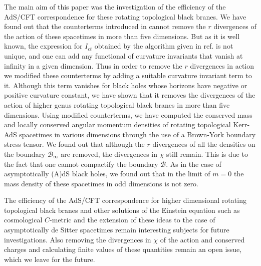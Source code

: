 \documentclass[a4paper,12pt,onecolumn]{revtex4}
\begin{document}
The main aim of this paper was the investigation of the efficiency of the
AdS/CFT correspondence for these rotating topological black branes. We have
found out that the counterterms introduced in \cite{Kls} cannot remove the $%
r $ divergences of the action of these spacetimes in more than
five dimensions. But as it is well known, the expression for
$I_{ct}$ obtained by the algorithm given in ref. \cite{Kls} is not
unique, and one can add any functional of curvature invariants
that vanish at infinity in a given dimension. Thus in order to
remove the $r$ divergences in action we modified these
counterterms by adding a suitable curvature invariant term to it.
Although this term vanishes for black holes whose horizons have
negative or positive curvature constant, we have shown that it
removes the divergences of the action of higher genus rotating
topological black branes in more than five dimensions. Using
modified counterterms, we have computed the conserved mass and
locally conserved angular momentum densities of rotating
topological Kerr-AdS spacetimes in various dimensions through the
use of a Brown-York boundary stress tensor. We found out that
although the $r$ divergences of all the densities on the boundary
$\mathcal{B}_\infty $ are removed, the divergences in $\chi $
still remain. This is due to the fact that one cannot compactify
the boundary $\mathcal{B}$. As in the case of asymptotically (A)dS
black holes, we found out that in the limit of $m=0$ the mass
density of these spacetimes in odd dimensions is not zero.

The efficiency of the AdS/CFT correspondence for higher
dimensional rotating topological black branes and other solutions
of the Einstein equation such as cosmological $C$-metric and the
extension of these ideas to the case of asymptotically de Sitter
spacetimes remain interesting subjects for future investigations.
Also removing the divergences in $\chi $ of the action and
conserved charges and calculating finite values of these
quantities remain an open issue, which we leave for the future.
\end{document}
